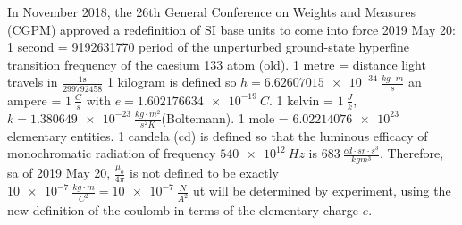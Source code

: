 In November 2018, the 26th General Conference on Weights and Measures (CGPM) approved a redefinition of SI base units to come into force 2019 May 20:
1 second = 9192631770 period of the unperturbed ground-state hyperfine transition frequency of the caesium 133 atom (old).
 1 metre = distance light travels in $\frac{1 \text{s}}{299792458}$ 1 kilogram is defined so $h =\SI{6.62607015e-34}{\frac{kg \cdot m}{s}}$ an ampere = $\SI{1}{\frac{C}{s}}$ with $e = \SI{1.602176634e-19}{C}$.
1 kelvin = $\SI{1}{\frac{J}{k}}$, $k = \SI{1.380649e-23}{\frac{kg \cdot m^2}{s^2 K}}$(Boltemann). 
1 mole = $\SI{6.02214076e23}{}$ elementary entities. 
1 candela (cd) is defined so that the luminous efficacy of monochromatic radiation of frequency $\SI{540e12}{Hz}$ is $\SI{683}{\frac{cd \cdot sr \cdot s^3}{kg m^3}}$.
Therefore, sa of 2019 May 20, $\frac{\mu_0}{4\pi}$ is not defined to be exactly $\SI{10e-7}{\frac{kg \cdot m}{C^2}} = \SI{10e-7}{\frac{N}{A^2}}$ ut will be determined by experiment, using the new definition of the coulomb in terms of the elementary charge $e$. 
